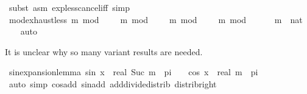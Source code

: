 \begin{isabellebody}
\ {\isacharparenleft}{\kern0pt}subst\ {\isacharparenleft}{\kern0pt}asm{\isacharparenright}{\kern0pt}\ exp{\isacharunderscore}{\kern0pt}less{\isacharunderscore}{\kern0pt}cancel{\isacharunderscore}{\kern0pt}iff{\isacharparenright}{\kern0pt}\ simp\isanewline
{}\isamarkupfalse%
%
\endisatagproof
{\isafoldproof}%
%
\isadelimproof
%
\endisadelimproof
%
\isadelimdocument
%
\endisadelimdocument
%
\isatagdocument
%
\isamarkuptrue%
%
\endisatagdocument
{\isafolddocument}%
%
\isadelimdocument
%
\endisadelimdocument
{}\isamarkupfalse%
\ mod{\isacharunderscore}{\kern0pt}exhaust{\isacharunderscore}{\kern0pt}less{\isacharunderscore}{\kern0pt}{}{\isacharcolon}{\kern0pt}\ {\isachardoublequoteopen}m\ mod\ {}\ {\isacharequal}{\kern0pt}\ {}\ {\isasymor}\ m\ mod\ {}\ {\isacharequal}{\kern0pt}\ {}\ {\isasymor}\ m\ mod\ {}\ {\isacharequal}{\kern0pt}\ {}\ {\isasymor}\ m\ mod\ {}\ {\isacharequal}{\kern0pt}\ {}{\isachardoublequoteclose}\isanewline
\ \ \ m\ {\isacharcolon}{\kern0pt}{\isacharcolon}{\kern0pt}\ nat\isanewline
%
\isadelimproof
\ \ %
\endisadelimproof
%
\isatagproof
{}\isamarkupfalse%
\ auto%
\endisatagproof
{\isafoldproof}%
%
\isadelimproof
%
\endisadelimproof
%
\begin{isamarkuptext}%
It is unclear why so many variant results are needed.%
\end{isamarkuptext}\isamarkuptrue%
\isamarkupfalse%
\ sin{\isacharunderscore}{\kern0pt}expansion{\isacharunderscore}{\kern0pt}lemma{\isacharcolon}{\kern0pt}\ {\isachardoublequoteopen}sin\ {\isacharparenleft}{\kern0pt}x\ {\isacharplus}{\kern0pt}\ real\ {\isacharparenleft}{\kern0pt}Suc\ m{\isacharparenright}{\kern0pt}\ {\isacharasterisk}{\kern0pt}\ pi\ {\isacharslash}{\kern0pt}\ {}{\isacharparenright}{\kern0pt}\ {\isacharequal}{\kern0pt}\ cos\ {\isacharparenleft}{\kern0pt}x\ {\isacharplus}{\kern0pt}\ real\ m\ {\isacharasterisk}{\kern0pt}\ pi\ {\isacharslash}{\kern0pt}\ {}{\isacharparenright}{\kern0pt}{\isachardoublequoteclose}\isanewline
%
\isadelimproof
\ \ %
\endisadelimproof
%
\isatagproof
{}\isamarkupfalse%
\ {\isacharparenleft}{\kern0pt}auto\ simp{\isacharcolon}{\kern0pt}\ cos{\isacharunderscore}{\kern0pt}add\ sin{\isacharunderscore}{\kern0pt}add\ add{\isacharunderscore}{\kern0pt}divide{\isacharunderscore}{\kern0pt}distrib\ distrib{\isacharunderscore}{\kern0pt}right{\isacharparenright}{\kern0pt}%

\end{isabellebody}
